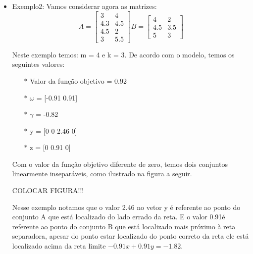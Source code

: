 \begin{itemize}
\item Exemplo2:
Vamos  considerar agora as matrizes:
$$A=\begin{bmatrix}3 & 4\\ 4.3 & 4.5\\ 4.5 & 2\\ 3 & 5.5\end{bmatrix}
B=\begin{bmatrix}4 & 2\\ 4.5 & 3.5\\ 5 & 3\end{bmatrix}$$

Neste exemplo temos: m = 4 e k = 3. De acordo com o modelo, temos os seguintes valores:
\begin{itemize}
\item[$\ast$] Valor da função objetivo = 0.92
\item[$\ast$] $\omega$ = [-0.91  0.91]
\item[$\ast$] $\gamma$ = -0.82
\item[$\ast$] y = [0 0 2.46 0]
\item[$\ast$] z = [0 0.91 0]
\end{itemize}

Com o valor da função objetivo diferente de zero, temos dois conjuntos linearmente inseparáveis, como ilustrado na figura a seguir.

COLOCAR FIGURA!!!

Nesse exemplo notamos que o valor 2.46 no vetor y é referente ao ponto do conjunto A que está localizado do lado errado da reta. E o valor 0.91é referente ao ponto do conjunto B que está localizado mais próximo à reta separadora, apesar do ponto estar localizado do ponto correto da reta ele está localizado acima da reta limite $-0.91x + 0.91y = -1.82$.
\end{itemize}
